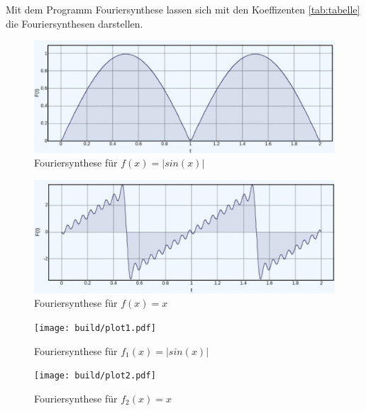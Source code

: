 Mit dem Programm Fouriersynthese \cite{Fouriersynthese} lassen sich mit den Koeffizenten \ref{tab:tabelle} die Fouriersynthesen darstellen.

\begin{figure}
    \centering
    \includegraphics[width=\textwidth]{website/sin.jpg}
    \caption{Fouriersynthese für $f(x)=|sin(x)|$}
\end{figure}


\begin{figure}
    \centering
    \includegraphics[width=\textwidth]{website/x.jpg}
    \caption{Fouriersynthese für $f(x)=x$}
\end{figure}

\begin{figure}
    \centering
    \texttt{[image: build/plot1.pdf]}
    \caption{Fouriersynthese für $f_1(x)=|sin(x)|$}
    \label{fig:FS_sin}
\end{figure}

\begin{figure}
    \centering
    \texttt{[image: build/plot2.pdf]}
    \caption{Fouriersynthese für $f_2(x)=x$}
    \label{fig:FS_x}
\end{figure}
